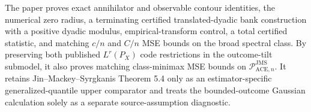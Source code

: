 The paper proves exact annihilator and observable contour identities, the numerical zero radius, a terminating certified translated-dyadic bank construction with a positive dyadic modulus, empirical-transform control, a total certified statistic, and matching \(c/n\) and \(C/n\) MSE bounds on the broad spectral class. By preserving both published \(L^r(P_X)\) code restrictions in the outcome-tilt submodel, it also proves matching class-minimax MSE bounds on \(\mathcal P_{\mathrm{ACE},n}^{\mathrm{JMS}}\). It retains Jin--Mackey--Syrgkanis Theorem 5.4 only as an estimator-specific generalized-quantile upper comparator and treats the bounded-outcome Gaussian calculation solely as a separate source-assumption diagnostic.